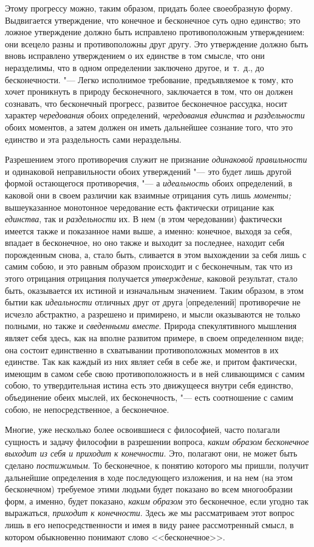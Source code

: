 Этому прогрессу можно, таким образом, придать более своеобразную форму.
Выдвигается утверждение, что конечное и бесконечное суть одно единство; это
ложное утверждение должно быть исправлено противоположным утверждением: они
всецело разны и противоположны друг другу. Это утверждение должно быть
вновь исправлено утверждением о их единстве в том смысле, что они
неразделимы, что в одном определении заключено другое, и~т.~д., до
бесконечности. "--- Легко исполнимое требование, предъявляемое к тому, кто
хочет проникнуть в природу бесконечного, заключается в том, что он должен
сознавать, что бесконечный прогресс, развитое бесконечное рассудка, носит
характер {\em чередования} обоих определений,
{\em чередования единства} и
{\em раздельности} обоих моментов, а затем должен он
иметь дальнейшее сознание того, что это единство и эта раздельность сами
нераздельны.

Разрешением этого противоречия служит не признание
{\em одинаковой правильности} и одинаковой
неправильности обоих утверждений "--- это будет лишь другой формой остающегося
противоречия, "--- а {\em идеальность} обоих определений,
в каковой они в своем различии как взаимные отрицания суть лишь
{\em моменты;} вышеуказанное монотонное чередование
есть фактически отрицание как {\em единства}, так и
{\em раздельности} их. В нем (в этом чередовании)
фактически имеется также и показанное нами выше, а именно: конечное, выходя
за себя, впадает в бесконечное, но оно также и выходит за последнее,
находит себя порожденным снова, а, стало быть, сливается в этом выхождении
за себя лишь с самим собою, и это равным образом происходит и с
бесконечным, так что из этого отрицания отрицания получается
{\em утверждение}, каковой результат, стало быть,
оказывается их истиной и изначальным значением. Таким образом, в этом бытии
как {\em идеальности} отличных друг от друга
[определений] противоречие не исчезло абстрактно, а разрешено и примирено,
и мысли оказываются не только полными, но также и
{\em сведенными вместе}. Природа спекулятивного
мышления являет себя здесь, как на вполне развитом примере, в своем
определенном виде; она состоит единственно в схватывании противоположных
моментов в их единстве. Так как каждый из них являет себя в себе же, и
притом фактически, имеющим в самом себе свою противоположность и в ней
сливающимся с самим собою, то утвердительная истина есть это движущееся
внутри себя единство, объединение обеих мыслей, их бесконечность, "--- есть
соотношение с самим собою, не непосредственное, а бесконечное.

Многие, уже несколько более освоившиеся с философией, часто полагали
сущность и задачу философии в разрешении вопроса,
{\em каким образом бесконечное выходит из себя и
приходит к конечности}. Это, полагают они, не может быть сделано
{\em постижимым}. То бесконечное, к понятию которого мы
пришли, получит дальнейшие определения в ходе последующего изложения, и на
нем (на этом бесконечном) требуемое этими людьми будет показано во всем
многообразии форм, а именно, будет показано, {\em каким
образом} это бесконечное, если угодно так выражаться,
{\em приходит к конечности}. Здесь же мы рассматриваем
этот вопрос лишь в его непосредственности и имея в виду ранее рассмотренный
смысл, в котором обыкновенно понимают слово <<бесконечное>>.

